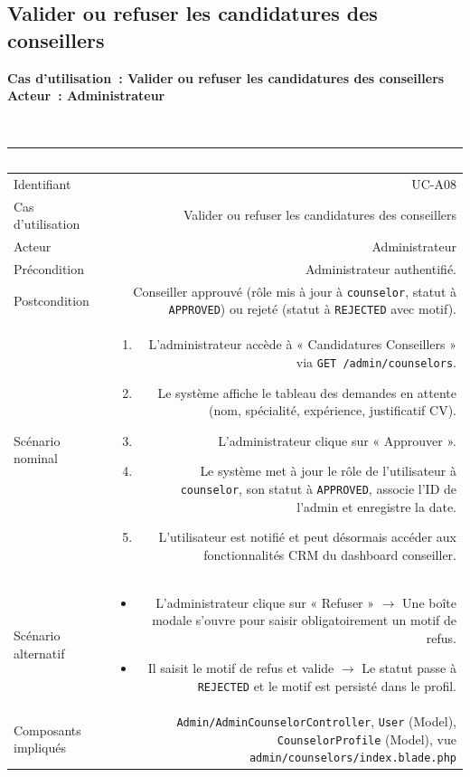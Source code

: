 \documentclass[a4paper,12pt]{article}
\newcommand{\ucheader}[2]{%
  \noindent\colorbox{capblue}{\parbox{\dimexpr\linewidth-2\fboxsep}{%
    \color{white}\bfseries\large Cas d'utilisation~: #1 \hfill \normalsize Acteur~: #2
  }}\\[2pt]
}
\begin{document}
\vspace{1em}

\subsection{Valider ou refuser les candidatures des conseillers}
\ucheader{Valider ou refuser les candidatures des conseillers}{Administrateur}

\noindent
\begin{tabular}{|L|R|}
\hline
{}\textcolor{white}{\textbf{Champ}} & \textcolor{white}{\textbf{Description}} \\
\hline
{}Identifiant & UC-A08 \\
\hline
Cas d'utilisation & Valider ou refuser les candidatures des conseillers \\
\hline
{}Acteur & Administrateur \\
\hline
Précondition & Administrateur authentifié. \\
\hline
{}Postcondition & Conseiller approuvé (rôle mis à jour à \texttt{counselor}, statut à \texttt{APPROVED}) ou rejeté (statut à \texttt{REJECTED} avec motif). \\
\hline
Scénario nominal &
\begin{enumerate}
  \item L'administrateur accède à « Candidatures Conseillers » via \texttt{GET /admin/counselors}.
  \item Le système affiche le tableau des demandes en attente (nom, spécialité, expérience, justificatif CV).
  \item L'administrateur clique sur « Approuver ».
  \item Le système met à jour le rôle de l'utilisateur à \texttt{counselor}, son statut à \texttt{APPROVED}, associe l'ID de l'admin et enregistre la date.
  \item L'utilisateur est notifié et peut désormais accéder aux fonctionnalités CRM du dashboard conseiller.
\end{enumerate} \\
\hline
{}Scénario alternatif &
\begin{itemize}
  \item L'administrateur clique sur « Refuser » $\rightarrow$ Une boîte modale s'ouvre pour saisir obligatoirement un motif de refus.
  \item Il saisit le motif de refus et valide $\rightarrow$ Le statut passe à \texttt{REJECTED} et le motif est persisté dans le profil.
\end{itemize} \\
\hline
Composants impliqués & \texttt{Admin/AdminCounselorController}, \texttt{User} (Model), \texttt{CounselorProfile} (Model), vue \texttt{admin/counselors/index.blade.php} \\
\hline
\end{tabular}
\end{document}

